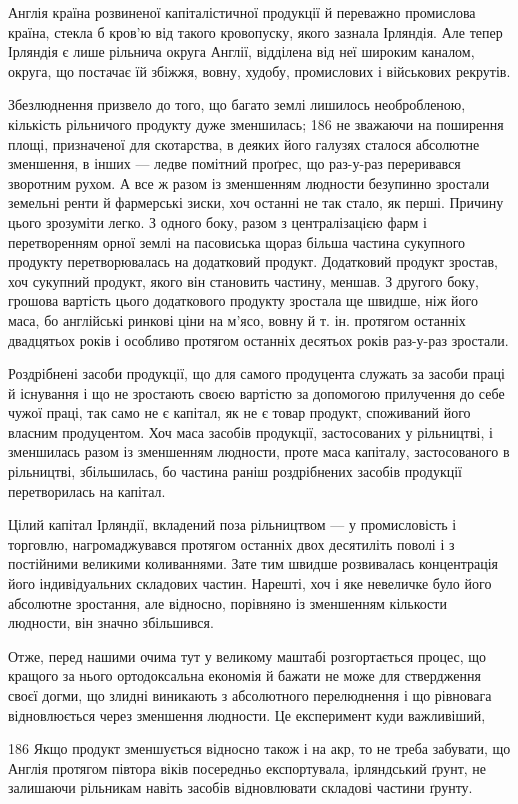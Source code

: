 Англія країна розвиненої капіталістичної продукції й переважно
промислова країна, стекла б кров’ю від такого кровопуску,
якого зазнала Ірляндія. Але тепер Ірляндія є лише рільнича
округа Англії, відділена від неї широким каналом, округа, що
постачає їй збіжжя, вовну, худобу, промислових і військових
рекрутів.

Збезлюднення призвело до того, що багато землі лишилось
необробленою, кількість рільничого продукту дуже зменшилась; 186
не зважаючи на поширення площі, призначеної для
скотарства, в деяких його галузях сталося абсолютне зменшення,
в інших — ледве помітний проґрес, що раз-у-раз переривався
зворотним рухом. А все ж разом із зменшенням людности
безупинно зростали земельні ренти й фармерські зиски,
хоч останні не так стало, як перші. Причину цього зрозуміти
легко. З одного боку, разом з централізацією фарм і перетворенням
орної землі на пасовиська щораз більша частина сукупного
продукту перетворювалась на додатковий продукт. Додатковий
продукт зростав, хоч сукупний продукт, якого він становить
частину, меншав. З другого боку, грошова вартість цього
додаткового продукту зростала ще швидше, ніж його маса, бо
англійські ринкові ціни на м’ясо, вовну й т. ін. протягом останніх
двадцятьох років і особливо протягом останніх десятьох років
раз-у-раз зростали.

Роздрібнені засоби продукції, що для самого продуцента служать
за засоби праці й існування і що не зростають своєю вартістю
за допомогою прилучення до себе чужої праці, так само
не є капітал, як не є товар продукт, споживаний його власним
продуцентом. Хоч маса засобів продукції, застосованих у рільництві,
і зменшилась разом із зменшенням людности, проте
маса капіталу, застосованого в рільництві, збільшилась, бо
частина раніш роздрібнених засобів продукції перетворилась на
капітал.

Цілий капітал Ірляндії, вкладений поза рільництвом — у
промисловість і торговлю, нагромаджувався протягом останніх
двох десятиліть поволі і з постійними великими коливаннями.
Зате тим швидше розвивалась концентрація його індивідуальних
складових частин. Нарешті, хоч і яке невеличке було його абсолютне
зростання, але відносно, порівняно із зменшенням кількости
людности, він значно збільшився.

Отже, перед нашими очима тут у великому маштабі розгортається
процес, що кращого за нього ортодоксальна економія й
бажати не може для ствердження своєї догми, що злидні виникають
з абсолютного перелюднення і що рівновага відновлюється
через зменшення людности. Це експеримент куди важливіший,

186    Якщо продукт зменшується відносно також і на акр, то не треба
забувати, що Англія протягом півтора віків посередньо експортувала,
ірляндський ґрунт, не залишаючи рільникам навіть засобів відновлювати
складові частини ґрунту.
